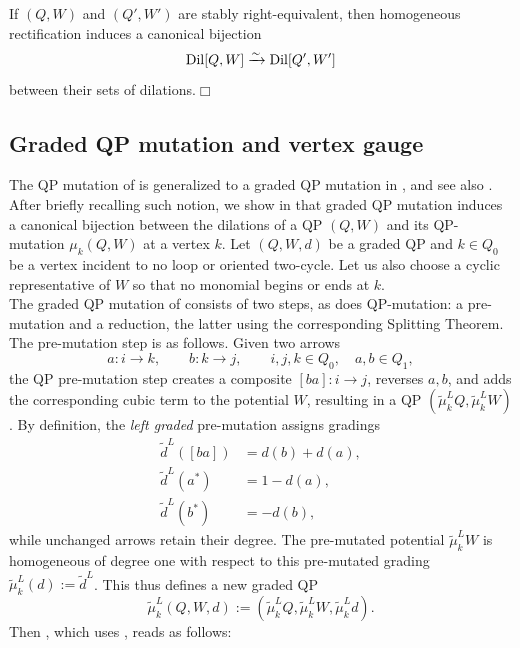 \begin{corollary}\label{cor:G1-presentation}
If \((Q,W)\) and \((Q',W')\) are stably right-equivalent, then homogeneous
rectification induces a canonical bijection
\[
 \operatorname{Dil}[Q,W]
 \xrightarrow{\sim}
 \operatorname{Dil}[Q',W']
\]
between their sets of dilations.\hfill$\Box$
\end{corollary}

\subsection{Graded QP mutation and vertex gauge}\label{sec:graded-mutation}

The QP mutation of \cite[Section 5]{DWZ} is generalized to a graded QP mutation in \cite[Section 6.3]{AO}, and see also \cite{Keller2026_GradedPreprint}. After briefly recalling such notion, we show in  that graded QP mutation induces a canonical bijection between the dilations of a QP $(Q,W)$ and its QP-mutation $\mu_k(Q,W)$ at a vertex $k$. Let \((Q,W,d)\) be a graded QP and \(k\in Q_0\) be a vertex incident
to no loop or oriented two-cycle. Let us also choose a cyclic representative of $W$ so that no monomial begins or ends at \(k\).\\

The graded QP mutation of \cite[Section 6.3]{AO} consists of two steps, as does QP-mutation: a pre-mutation and a reduction, the latter using the corresponding Splitting Theorem. The pre-mutation step is as follows. Given two arrows
\[
 a:i\longrightarrow k,
 \qquad
 b:k\longrightarrow j,\qquad i,j,k\in Q_0,\quad a,b\in Q_1,
\]
the QP pre-mutation step creates a composite \([ba]:i\to j\), reverses \(a,b\), and
adds the corresponding cubic term to the potential $W$, resulting in a QP $(\tilde{\mu}_k^L Q,\tilde{\mu}_k^L W)$. By definition, the {\it left graded} pre-mutation assigns gradings
\begin{align}
 \widetilde d^L([ba])&=d(b)+d(a),\label{eq:mut-composite}\\
 \widetilde d^L(a^*)&=1-d(a),\label{eq:mut-incoming}\\
 \widetilde d^L(b^*)&=-d(b),\label{eq:mut-outgoing}
\end{align}
while unchanged arrows retain their degree. The pre-mutated potential $\tilde{\mu}_k^LW$ is
homogeneous of degree one with respect to this pre-mutated grading $\tilde{\mu}_k^L(d):=\widetilde{d}^L$. This thus defines a new graded QP
$$\tilde{\mu}_k^L(Q,W,d):=(\tilde{\mu}_k^L Q,\tilde{\mu}_k^L W,\tilde{\mu}_k^L d).$$
Then \cite[Definition 6.8]{AO}, which uses \cite[Thm.~6.6 \& Prop.~6.7]{AO}, reads as follows:

